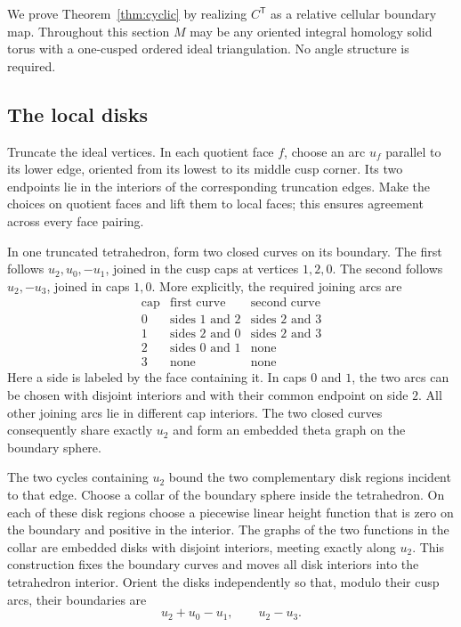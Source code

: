 \documentclass[11pt]{article}
\theoremstyle{definition}\newtheorem{definition}[theorem]{Definition}
\theoremstyle{remark}\newtheorem{remark}[theorem]{Remark}
\begin{document}
We prove Theorem~\ref{thm:cyclic} by realizing $C^{\mathsf T}$ as a
relative cellular boundary map. Throughout this section $M$ may be any
oriented integral homology solid torus with a one-cusped ordered ideal
triangulation. No angle structure is required.

\subsection{The local disks}

Truncate the ideal vertices. In each quotient face $f$, choose an arc
$u_f$ parallel to its lower edge, oriented from its lowest to its middle
cusp corner. Its two endpoints lie in the interiors of the corresponding
truncation edges. Make the choices on quotient faces and lift them to
local faces; this ensures agreement across every face pairing.

In one truncated tetrahedron, form two closed curves on its boundary.
The first follows $u_2,u_0,-u_1$, joined in the cusp caps at vertices
$1,2,0$. The second follows $u_2,-u_3$, joined in caps $1,0$. More
explicitly, the required joining arcs are
\[
\begin{array}{c|cc}
 \text{cap}&\text{first curve}&\text{second curve}\\\hline
 0&\text{sides }1\text{ and }2&\text{sides }2\text{ and }3\\
 1&\text{sides }2\text{ and }0&\text{sides }2\text{ and }3\\
 2&\text{sides }0\text{ and }1&\text{none}\\
 3&\text{none}&\text{none}
\end{array}
\]
Here a side is labeled by the face containing it. In caps $0$ and $1$,
the two arcs can be chosen with disjoint interiors and with their common
endpoint on side $2$. All other joining arcs lie in different cap
interiors. The two closed curves consequently share exactly $u_2$ and
form an embedded theta graph on the boundary sphere.

The two cycles containing $u_2$ bound the two complementary disk regions
incident to that edge. Choose a collar of the boundary sphere inside the
tetrahedron. On each of these disk regions choose a piecewise linear
height function that is zero on the boundary and positive in the
interior. The graphs of the two functions in the collar are embedded
disks with disjoint interiors, meeting exactly along $u_2$. This
construction fixes the boundary curves and moves all disk interiors
into the tetrahedron interior. Orient the disks independently so that,
modulo their cusp arcs, their boundaries are
\[
 u_2+u_0-u_1,\qquad u_2-u_3.
\]
\end{document}
